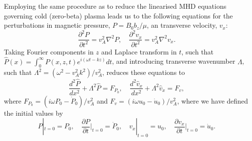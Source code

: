 \documentclass{aastex61}
\begin{document}
Employing the same procedure as \cite{rud_etal06} to reduce the linearised MHD equations governing cold (zero-beta) plasma leads us to the following equations for the perturbations in magnetic pressure, $P = B_0b_z/\mu$, an transverse velocity, $v_x$:
\begin{equation}
\frac{\partial^2P}{\partial{}t^2} = v_A^2 \nabla^2P, \quad \frac{\partial^2v_x}{\partial{}t^2} = v_A^2 \nabla^2v_x.
\end{equation}
Taking Fourier components in $z$ and Laplace transform in $t$, such that $\hat{P}(x) = \int_0^\infty P(x,z,t)e^{i(\omega{}t-kz)} dt$, and introducing transverse wavenumber $\Lambda$, such that $\Lambda^2 = (\omega^2 - v_A^2k^2) / v_A^2$, reduces these equations to
\begin{equation}
\frac{d^2\hat{P}}{dx^2} + \Lambda^2 \hat{P} = F_{P_0}, \quad \frac{d^2\hat{v}_x}{dx^2} + \Lambda^2 \hat{v}_x = F_v,
\end{equation}
where $F_{P_0} = (i\omega P_0 - \dot{P}_0) / v_A^2$ and $F_v = (i\omega u_0 - \dot{u}_0) / v_A^2$, where we have defined the initial values by
\begin{equation}
P|_{t=0} = P_0, \quad \frac{\partial{}P}{\partial{t}}\biggr\rvert_{t=0} = \dot{P}_0, \quad v_x|_{t=0} = u_0, \quad \frac{\partial{}v_x}{\partial{t}}\biggr\rvert_{t=0} = \dot{u}_0.
\end{equation}
\end{document}
